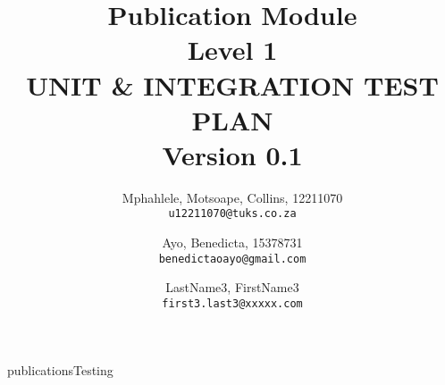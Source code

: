 \documentclass[a4paper]{article}
\title{Publication Module\\
	Level 1\\
	UNIT \& INTEGRATION TEST PLAN\\
	Version 0.1
}
\author{
	Mphahlele, Motsoape, Collins, 12211070\\
	\texttt{u12211070@tuks.co.za}
	\and
	Ayo, Benedicta, 15378731\\
	\texttt{benedictaoayo@gmail.com}
	\and
	LastName3, FirstName3\\
	\texttt{first3.last3@xxxxx.com}
}
\begin{document}
\maketitle
\newpage
\tableofcontents

\newpage
{publicationsTesting}



\end{document}
